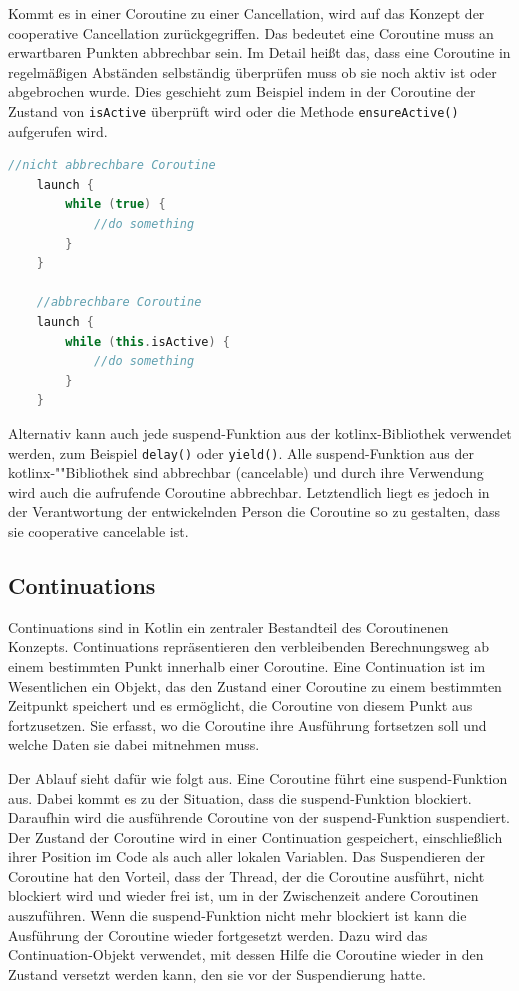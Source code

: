 \documentclass[fontsize=12pt,paper=a4,twoside=semi,parskip=half-,headsepline,headinclude]{scrreprt}
\begin{document}
Kommt es in einer Coroutine zu einer Cancellation, wird auf das Konzept der cooperative Cancellation\cite{Cancellation2024} zurückgegriffen. Das bedeutet eine Coroutine muss an erwartbaren Punkten abbrechbar sein. Im Detail heißt das, dass eine Coroutine in regelmäßigen Abständen selbständig überprüfen muss ob sie noch aktiv ist oder abgebrochen wurde. Dies geschieht zum Beispiel indem in der Coroutine der Zustand von \texttt{isActive} überprüft wird oder die Methode \texttt{ensureActive()} aufgerufen wird.

\begin{lstlisting}[language=Kotlin]
	//nicht abbrechbare Coroutine
	launch {
		while (true) {
			//do something
		}
	}

	//abbrechbare Coroutine
	launch {
		while (this.isActive) {
			//do something
		}
	}
\end{lstlisting}

Alternativ kann auch jede suspend-Funktion aus der kotlinx-Bibliothek verwendet werden, zum Beispiel \texttt{delay()} oder \texttt{yield()}. Alle suspend-Funktion aus der kotlinx-""Bibliothek sind abbrechbar (cancelable) und  durch ihre Verwendung wird auch die aufrufende Coroutine abbrechbar. Letztendlich liegt es jedoch in der Verantwortung der entwickelnden Person die Coroutine so zu gestalten, dass sie cooperative cancelable ist.

\subsection{Continuations}

Continuations sind in Kotlin ein zentraler Bestandteil des Coroutinenen Konzepts. Continuations repräsentieren den verbleibenden Berechnungsweg ab einem bestimmten Punkt innerhalb einer Coroutine. Eine Continuation ist im Wesentlichen ein Objekt, das den Zustand einer Coroutine zu einem bestimmten Zeitpunkt speichert und es ermöglicht, die Coroutine von diesem Punkt aus fortzusetzen. Sie erfasst, wo die Coroutine ihre Ausführung fortsetzen soll und welche Daten sie dabei mitnehmen muss.

Der Ablauf sieht dafür wie folgt aus. Eine Coroutine führt eine suspend-Funktion aus. Dabei kommt es zu der Situation, dass die suspend-Funktion blockiert. Daraufhin wird die ausführende Coroutine von der suspend-Funktion suspendiert. Der Zustand der Coroutine wird in einer Continuation gespeichert, einschließlich ihrer Position im Code als auch aller lokalen Variablen. Das Suspendieren der Coroutine hat den Vorteil, dass der Thread, der die Coroutine ausführt, nicht blockiert wird und wieder frei ist, um in der Zwischenzeit andere Coroutinen auszuführen. Wenn die suspend-Funktion nicht mehr blockiert ist kann die Ausführung der Coroutine wieder fortgesetzt werden. Dazu wird das Continuation-Objekt verwendet, mit dessen Hilfe die Coroutine wieder in den Zustand versetzt werden kann, den sie vor der Suspendierung hatte.
\end{document}
